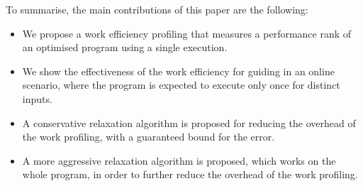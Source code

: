To summarise, the main contributions of this paper are the following:
\begin{itemize}
\item We propose a work efficiency profiling that measures a performance rank
of an optimised program using a single execution.
\item We show the effectiveness of the work efficiency for guiding {\itercomp} in an
online scenario, where the program is expected to execute only once for distinct
inputs.
\item A conservative relaxation algorithm is proposed for reducing the overhead of the work profiling, with a guaranteed bound for the error.
\item A more aggressive relaxation algorithm is proposed, which works on the whole program, in order to further reduce the overhead of the work profiling.
\end{itemize}
